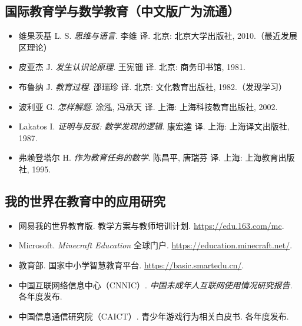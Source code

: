 \documentclass[12pt,a4paper]{scrartcl}
\begin{document}
\subsection{国际教育学与数学教育（中文版广为流通）}
\begin{itemize}[leftmargin=1.3em,itemsep=0.15em,topsep=0.3em]
  \item 维果茨基 L. S. \emph{思维与语言}. 李维 译. 北京: 北京大学出版社, 2010.（最近发展区理论）
  \item 皮亚杰 J. \emph{发生认识论原理}. 王宪钿 译. 北京: 商务印书馆, 1981.
  \item 布鲁纳 J. \emph{教育过程}. 邵瑞珍 译. 北京: 文化教育出版社, 1982.（发现学习）
  \item 波利亚 G. \emph{怎样解题}. 涂泓, 冯承天 译. 上海: 上海科技教育出版社, 2002.
  \item Lakatos I. \emph{证明与反驳: 数学发现的逻辑}. 康宏逵 译. 上海: 上海译文出版社, 1987.
  \item 弗赖登塔尔 H. \emph{作为教育任务的数学}. 陈昌平, 唐瑞芬 译. 上海: 上海教育出版社, 1995.
\end{itemize}

\subsection{我的世界在教育中的应用研究}
\begin{itemize}[leftmargin=1.3em,itemsep=0.15em,topsep=0.3em]
  \item 网易我的世界教育版. 教学方案与教师培训计划. \url{https://edu.163.com/mc}.
  \item Microsoft. \emph{Minecraft Education} 全球门户. \url{https://education.minecraft.net/}.
  \item 教育部. 国家中小学智慧教育平台. \url{https://basic.smartedu.cn/}.
  \item 中国互联网络信息中心（CNNIC）. \emph{中国未成年人互联网使用情况研究报告}. 各年度发布.
  \item 中国信息通信研究院（CAICT）. 青少年游戏行为相关白皮书. 各年度发布.
\end{itemize}
\end{document}
